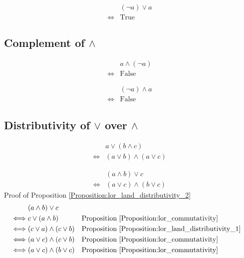 \begin{prop}
\label{Proposition:lor_complement_2}
\begin{align*}
& (\lnot a) \lor a \\
\iff & \text{True}
\end{align*}
\end{prop}

\subsection{Complement of $\land$}
\begin{prop}
\label{Proposition:land_complement_1}
\begin{align*}
& a \land (\lnot a) \\
\iff & \text{False}
\end{align*}
\end{prop}

\begin{prop}
\label{Proposition:land_complement_2}
\begin{align*}
& (\lnot a) \land a \\
\iff & \text{False}
\end{align*}
\end{prop}

\subsection{Distributivity of $\lor$ over $\land$}
\begin{prop}
\label{Proposition:lor_land_distributivity_1}
\begin{align*}
& a \lor (b \land c) \\
\iff & (a \lor b) \land (a \lor c)
\end{align*}
\end{prop}

\begin{prop}
\label{Proposition:lor_land_distributivity_2}
\begin{align*}
& (a \land b) \lor c \\
\iff & (a \lor c) \land (b \lor c)
\end{align*}
Proof of Proposition \ref{Proposition:lor_land_distributivity_2}
\begin{align*}
& (a \land b) \lor c \\
\iff & c \lor (a \land b)
& & \text{Proposition \ref{Proposition:lor_commutativity}} \\
\iff & (c \lor a) \land (c \lor b)
& & \text{Proposition \ref{Proposition:lor_land_distributivity_1}} \\
\iff & (a \lor c) \land (c \lor b)
& & \text{Proposition \ref{Proposition:lor_commutativity}} \\
\iff & (a \lor c) \land (b \lor c)
& & \text{Proposition \ref{Proposition:lor_commutativity}} \\
\end{align*}
\end{prop}

